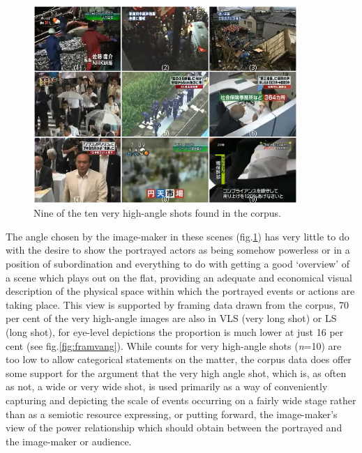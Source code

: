 \begin{figure}[t]
\centering
\includegraphics[width=10cm]{hiAngle-montage.jpg} 
\caption[Montage of high-angle camera shots]{Nine of the ten very high-angle shots found in the corpus.}
\label{fig:montage-hiang}
\end{figure}

The angle chosen by the image-maker in these scenes (fig.\ref{fig:montage-hiang}) has very little to do with the desire to show the portrayed actors as being somehow powerless or in a position of subordination and everything to do with getting a good `overview' of a scene which plays out on the flat, providing an adequate and economical visual description of the physical space within which the portrayed events or actions are taking place. This view is supported by framing data drawn from the corpus, 70 per cent of the very high-angle images are also in VLS (very long shot) or LS (long shot), for eye-level depictions the proportion is much lower at just 16 per cent (see fig.\ref{fig:framvang}). While counts for very high-angle shots (\emph{n}=10) are too low to allow categorical statements on the matter, the corpus data does offer some support for the argument that the very high angle shot, which is, as often as not, a wide or very wide shot, is used primarily as a way of conveniently capturing and depicting the scale of events occurring on a fairly wide stage rather than as a semiotic resource expressing, or putting forward, the image-maker's view of the power relationship which should obtain between the portrayed and the image-maker or audience.

